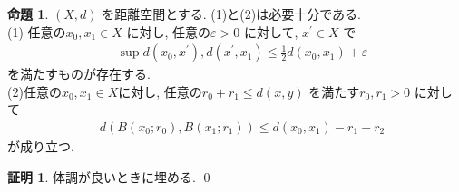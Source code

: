\documentclass[10pt, fleqn, label-section=none]{bxjsarticle}
\theoremstyle{definition}
\newtheorem{prop}[dfn]{命題}
\newtheorem*{pf*}{証明}
\newcommand{\veps}{\varepsilon}
\renewcommand{\;}{\, ; \,}
\begin{document}
\begin{prop}
$(X, d)$ を距離空間とする. (1)と(2)は必要十分である.\\
(1) 任意の$x_0, x_1 \in X$ に対し, 任意の$\veps > 0$ に対して, $x^\prime \in X$ で
\begin{align*} \quad  \sup{ d(x_0 ,  x^\prime) , d(x^\prime , x_1)} \leq \frac{1}{2} d(x_0, x_1) + \veps \end{align*}
 を満たすものが存在する.  \\
 (2)任意の$x_0, x_1 \in X$に対し, 任意の$r_0 + r_1 \leq d(x,y)$ を満たす$r_0 , r_1 > 0$ に対して
 \begin{align*} \quad d(B(x_0; r_0), B(x_1 ; r_1)) \leq d(x_0, x_1) - r_1 - r_2\end{align*}
 が成り立つ. 
\end{prop}
\begin{pf*}
体調が良いときに埋める. 
\qed
\end{pf*}
\end{document}
